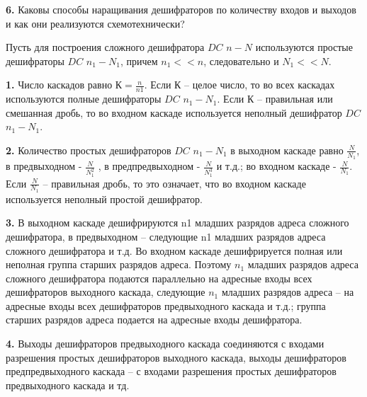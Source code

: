 \documentclass[a4paper,12pt]{article}
\begin{document}
\noindent\textbf{6.} Каковы способы наращивания дешифраторов по количеству входов и выходов и как они реализуются схемотехнически?\newline

\noindent Пусть для построения сложного дешифратора $DC$ $n-N$ используются простые дешифраторы $DC$ $n_{1} - N_{1}$, причем $n_{1} << n$, следовательно и $N_{1} << N$.\newline

\textbf{1. }Число каскадов равно $К = \frac{n}{n1}$. Если К – целое число, то во всех каскадах используются полные дешифраторы $DC$ $n_{1}-N_{1}$. Если $К$ – правильная или смешанная дробь, то во входном каскаде используется неполный дешифратор $DC$ $n_{1} - N_{1}$.\newline

\textbf{2. }Количество простых дешифраторов $DC$ $n_{1} - N_{1}$ в выходном каскаде равно $\frac{N}{N_{1}}$, в предвыходном - $\frac{N}{N_{1}^2}$ , в предпредвыходном - $\frac{N}{N_{1}^3}$ и т.д.; во входном каскаде - $\frac{N}{N_{1}}$. Если $\frac{N}{N_{1}}$ – правильная дробь, то это означает, что во входном каскаде используется неполный простой дешифратор.\newline

\textbf{3. }В выходном каскаде дешифрируются n1 младших разрядов адреса сложного дешифратора, в предвыходном – следующие n1 младших разрядов адреса сложного дешифратора и т.д. Во входном каскаде дешифрируется полная или неполная группа старших разрядов адреса. Поэтому $n_{1}$ младших разрядов адреса сложного дешифратора подаются параллельно на адресные входы всех дешифраторов выходного каскада, следующие $n_{1}$ младших разрядов адреса – на адресные входы всех дешифраторов предвыходного каскада и т.д.; группа старших разрядов адреса подается на адресные входы дешифратора.\newline

\textbf{4. }Выходы дешифраторов предвыходного каскада соединяются с входами разрешения простых дешифраторов выходного каскада, выходы дешифраторов предпредвыходного каскада – с входами разрешения простых дешифраторов предвыходного каскада и тд.
\end{document}
